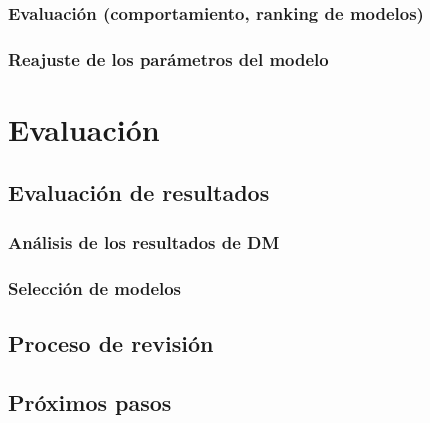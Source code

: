 \documentclass[11pt,a4paper,twoside]{tesis}
\begin{document}
\subsection{Evaluación (comportamiento, ranking de modelos)}

\subsection{Reajuste de los parámetros del modelo}


\chapter{Evaluación}
\section{Evaluación de resultados}
\subsection{Análisis de los resultados de DM}
\label{resultados}
\subsection{Selección de modelos}

\section{Proceso de revisión}

\section{Próximos pasos}

\end{document}
